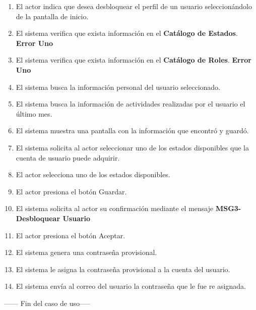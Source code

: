 	\begin{enumerate}
		\item El actor indica que desea desbloquear el perfil de un usuario seleccionándolo de la pantalla de inicio.
		\item El sistema verifica que exista información en el \textbf{Catálogo de Estados}. \textbf{Error Uno}
		\item El sistema verifica que exista información en el \textbf{Catálogo de Roles}. \textbf{Error Uno}
		\item El sistema busca la información personal del usuario seleccionado.
		\item El sistema busca la información de actividades realizadas por el usuario el último mes.
		\item El sistema muestra una pantalla con la información que encontró y guardó.
		\item El sistema solicita al actor seleccionar uno de los estados disponibles que la cuenta de usuario puede adquirir.
		\item El actor selecciona uno de los estados disponibles.
		\item El actor presiona el botón Guardar.
		\item El sistema solicita al actor su confirmación mediante el mensaje \textbf{MSG3-Desbloquear Usuario} 
		
		\item El actor presiona el botón Aceptar.
		
		\item El sistema genera una contraseña provisional.
		
		\item El sistema le asigna la contraseña provisional a la cuenta del usuario.
		
		\item El sistema envía al correo del usuario la contraseña que le fue re asignada.
	
	\end{enumerate}
	
------	Fin del caso de uso-----
